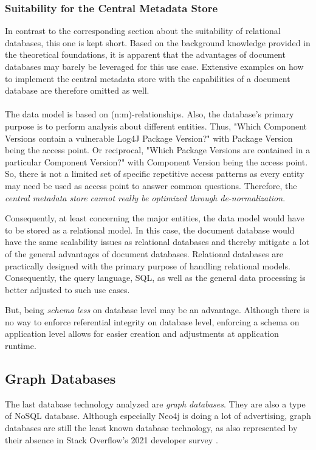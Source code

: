 \subsubsection{Suitability for the Central Metadata Store}
In contrast to the corresponding section about the suitability of relational databases, this one is kept short. Based on the background knowledge provided in the theoretical foundations, it is apparent that the advantages of document databases may barely be leveraged for this use case. Extensive examples on how to implement the central metadata store with the capabilities of a document database are therefore omitted as well.\\\\ 
The data model is based on (n:m)-relationships. Also, the database's primary purpose is to perform analysis about different entities. Thus, "Which Component Versions contain a vulnerable Log4J Package Version?" with Package Version being the access point. Or reciprocal, "Which Package Versions are contained in a particular Component Version?" with Component Version being the access point. So, there is not a limited set of specific repetitive access patterns as every entity may need be used as access point to answer common questions. Therefore, the \emph{central metadata store cannot really be optimized through de-normalization}.\par
Consequently, at least concerning the major entities, the data model would have to be stored as a relational model. In this case, the document database would have the same scalability issues as relational databases and thereby mitigate a lot of the general advantages of document databases. Relational databases are practically designed with the primary purpose of handling relational models. Consequently, the query language, SQL, as well as the general data processing is better adjusted to such use cases.\par 
But, being \emph{schema less} on database level may be an advantage. Although there is no way to enforce referential integrity on database level, enforcing a schema on application level allows for easier creation and adjustments at application runtime.

\subsection{Graph Databases}
The last database technology analyzed are \emph{graph databases}. They are also a type of NoSQL database. Although especially Neo4j is doing a lot of advertising, graph databases are still the least known database technology, as also represented by their absence in Stack Overflow's 2021 developer survey \cite{StackoverflowDeveloperSurvey}.

